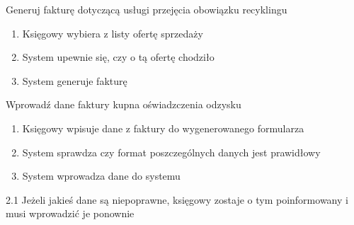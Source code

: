 	\begin{usecase}{Generuj fakturę dotyczącą usługi przejęcia obowiązku recyklingu}
		\author{Arkadiusz Socha} 
		\maketitle
\begin{scenario}
 
			\begin{enumerate}
				\item Księgowy wybiera z listy ofertę sprzedaży
				\item System upewnie się, czy o tą ofertę chodziło
				\item System generuje fakturę 
			\end{enumerate}

\end{scenario}
\end{usecase}

	\begin{usecase}{Wprowadź dane faktury kupna oświadzczenia odzysku}
		\author{Arkadiusz Socha} 
		\maketitle
\begin{scenario}
 
			\begin{enumerate}
				\item Księgowy wpisuje dane z faktury do wygenerowanego formularza
				\item System sprawdza czy format poszczególnych danych jest prawidłowy
				\item System wprowadza dane do systemu
			\end{enumerate}
		\end{scenario}
\begin{extensions}
		2.1 Jeżeli jakieś dane są niepoprawne, księgowy zostaje o tym poinformowany i musi wprowadzić je ponownie
	\end{extensions}
\end{usecase}

